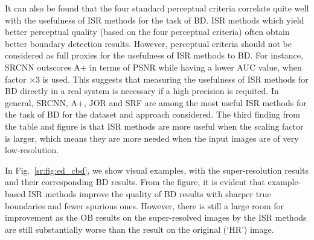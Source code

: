 It can also be found that the four standard perceptual criteria
correlate quite well with the usefulness of ISR methods for the task
of BD. ISR methods which yield better perceptual quality (based on the
four perceptual criteria) often obtain better boundary detection
results.  However, perceptual criteria should not be considered as full proxies for the
 usefulness of ISR methods to BD. For
instance, SRCNN outscores A+ in terms of PSNR while having a lower AUC
value, when factor $\times$3 is used. This suggests that measuring the
usefulness of ISR methods for BD directly in a real system is
necessary if a high precision is requited. In general, SRCNN, A+, JOR and SRF are 
among the most useful ISR methods for the task of BD for
the dataset and approach considered. The third finding from the table
and figure is that ISR methods are more useful when the scaling factor
is larger, which means they are more needed when the input images
are of very low-resolution.

In Fig.~\ref{sr:fig:ed_cbd}, we show visual examples, with the
super-resolution results and their corresponding BD results. From the
figure, it is evident that example-based ISR methods improve the
quality of BD results with sharper true boundaries and fewer spurious
ones. However, there is still a large room for improvement as the OB
results on the super-resolved images by the ISR methods are still
substantially worse than the result on the original (`HR') image.



